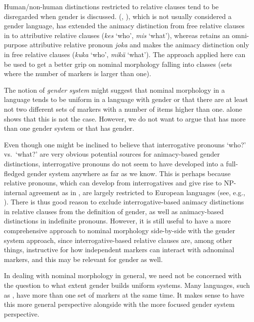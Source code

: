 \documentclass[output=collectionpaper]{langsci/langscibook}
\begin{document}
Human/non-human distinctions restricted to relative clauses tend to be disregarded when gender is discussed.  (, ), which is not usually considered a gender language, has extended the animacy distinction from free relative clauses in  to attributive relative clauses (\textit{kes} `who', \textit{mis} `what'), whereas  retains an omni-purpose attributive relative pronoun \textit{joka} and makes the animacy distinction only in free relative clauses (\textit{kuka} `who', \textit{mikä} `what'). The approach applied here can be used to get a better grip on nominal morphology falling into classes (sets where the number of markers is larger than one).

The notion of \emph{gender system} might suggest that nominal morphology in a language tends to be uniform in a language with gender or that there are at least not two different sets of markers with a number of items higher than one.  alone shows that this is not the case. However, we do not want to argue that  has more than one gender system or that  has gender.

Even though one might be inclined to believe that interrogative pronouns `who?' vs.\ `what?' are very obvious potential sources for animacy-based gender distinctions, interrogative pronouns do not seem to have developed into a full-fledged gender system anywhere as far as we know. This is perhaps because relative pronouns, which can develop from interrogatives and give rise to NP-internal agreement as in , are largely restricted to European languages (see, e.g., \citealt{ComrieKuteva2013}). There is thus good reason to exclude interrogative-based animacy distinctions in relative clauses from the definition of gender, as well as animacy-based distinctions in indefinite pronouns. However, it is still useful to have a more comprehensive approach to nominal morphology side-by-side with the gender system approach, since interrogative-based relative clauses are, among other things, instructive for how independent markers can interact with adnominal markers, and this may be relevant for gender as well.

In dealing with nominal morphology in general, we need not be concerned with the question to what extent gender builds uniform systems. Many languages, such as , have more than one set of markers at the same time. It makes sense to have this more general perspective alongside with the more focused gender system perspective.
\end{document}
